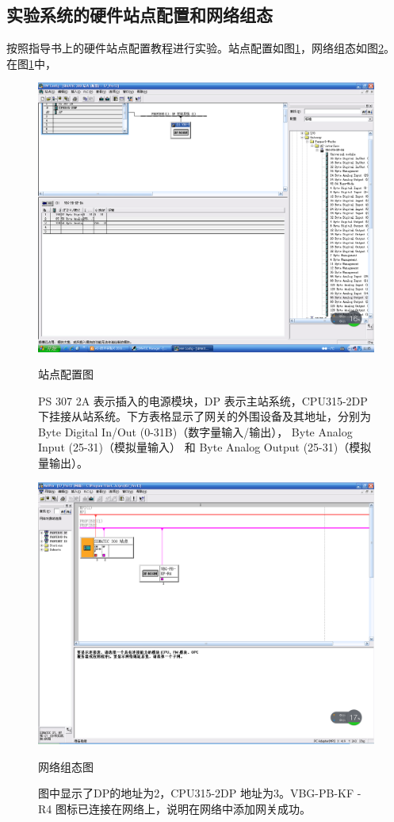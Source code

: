 \subsection{实验系统的硬件站点配置和网络组态}
按照指导书上的硬件站点配置教程进行实验。站点配置如图\ref{fig:hard_conf}，网络组态如图\ref{fig:net_org}。
在图\ref{fig:hard_conf}中，

\begin{figure}[htbp]
\centering
\includegraphics[width=12cm]{resource/hard_config.png}
\caption{站点配置图}
\caption*{\small{\ttfamily PS 307 2A} 表示插入的电源模块，{\ttfamily DP} 表示主站系统，{\ttfamily CPU315-2DP} 下挂接从站系统。下方表格显示了网关的外围设备及其地址，分别为{ Byte Digital In/Out (0-31B)}（数字量输入/输出），{ Byte Analog Input (25-31)}（模拟量输入） 和 { Byte Analog Output (25-31)}（模拟量输出）。}
\label{fig:hard_conf}
\end{figure}

\begin{figure}[htbp]
\centering
\includegraphics[width=12cm]{resource/net_organize.png}
\caption{网络组态图}
\caption*{\small 图中显示了{\ttfamily DP}的地址为2，{\ttfamily CPU315-2DP} 地址为3。{\ttfamily VBG-PB-KF -R4} 图标已连接在网络上，说明在网络中添加网关成功。}
\label{fig:net_org}
\end{figure}

